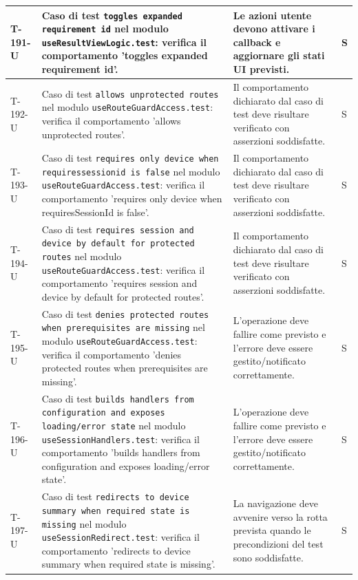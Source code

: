 \documentclass[a4paper,12pt]{article}
\begin{document}
{{\begin{longtable}{|>{\RaggedRight\arraybackslash}p{1.55cm}|>{\RaggedRight\arraybackslash}p{8.0cm}|>{\RaggedRight\arraybackslash}p{4.6cm}|>{\RaggedRight\arraybackslash}p{1.2cm}|}
        \hline
        T-191-U & Caso di test \texttt{toggles expanded requirement id} nel modulo \texttt{useResultViewLogic.test}: verifica il comportamento 'toggles expanded requirement id'. & Le azioni utente devono attivare i callback e aggiornare gli stati UI previsti. & S \\
        \hline
        T-192-U & Caso di test \texttt{allows unprotected routes} nel modulo \texttt{useRouteGuardAccess.test}: verifica il comportamento 'allows unprotected routes'. & Il comportamento dichiarato dal caso di test deve risultare verificato con asserzioni soddisfatte. & S \\
        \hline
        T-193-U & Caso di test \texttt{requires only device when requiressessionid is false} nel modulo \texttt{useRouteGuardAccess.test}: verifica il comportamento 'requires only device when requiresSessionId is false'. & Il comportamento dichiarato dal caso di test deve risultare verificato con asserzioni soddisfatte. & S \\
        \hline
        T-194-U & Caso di test \texttt{requires session and device by default for protected routes} nel modulo \texttt{useRouteGuardAccess.test}: verifica il comportamento 'requires session and device by default for protected routes'. & Il comportamento dichiarato dal caso di test deve risultare verificato con asserzioni soddisfatte. & S \\
        \hline
        T-195-U & Caso di test \texttt{denies protected routes when prerequisites are missing} nel modulo \texttt{useRouteGuardAccess.test}: verifica il comportamento 'denies protected routes when prerequisites are missing'. & L'operazione deve fallire come previsto e l'errore deve essere gestito/notificato correttamente. & S \\
        \hline
        T-196-U & Caso di test \texttt{builds handlers from configuration and exposes loading/error state} nel modulo \texttt{useSessionHandlers.test}: verifica il comportamento 'builds handlers from configuration and exposes loading/error state'. & L'operazione deve fallire come previsto e l'errore deve essere gestito/notificato correttamente. & S \\
        \hline
        T-197-U & Caso di test \texttt{redirects to device summary when required state is missing} nel modulo \texttt{useSessionRedirect.test}: verifica il comportamento 'redirects to device summary when required state is missing'. & La navigazione deve avvenire verso la rotta prevista quando le precondizioni del test sono soddisfatte. & S \\

\end{longtable}}}
\end{document}
